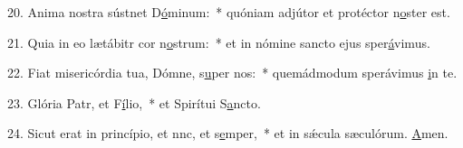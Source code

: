 20. Anima nostra sústnet D\uline{ó}minum:~* quóniam adjútor et protéctor n\uline{o}ster est.\par 
21. Quia in eo lætábitr cor n\uline{o}strum:~* et in nómine sancto ejus sper\uline{á}vimus.\par 
22. Fiat misericórdia tua, Dómne, s\uline{u}per nos:~* quemádmodum sperávimus \uline{i}n te.\par 
23. Glória Patr, et F\uline{í}lio,~* et Spirítui S\uline{a}ncto.\par 
24. Sicut erat in princípio, et nnc, et s\uline{e}mper,~* et in sǽcula sæculórum. \uline{A}men.\par 
